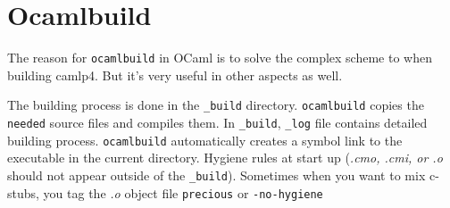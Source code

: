 \section{Ocamlbuild}
The reason for \verb|ocamlbuild| in OCaml is to solve the complex
scheme to when building camlp4. But it's very useful in other aspects
as well.

The building process is done in the \verb|_build|
directory. \verb|ocamlbuild| copies the \verb|needed| source files and
compiles them.  In \verb|_build|, \verb|_log| file contains detailed
building process. \verb|ocamlbuild| automatically creates a symbol
link to the executable in the current directory.  Hygiene rules at
start up (\textit{.cmo, .cmi, or .o} should not appear outside of the
\verb|_build|). Sometimes when you want to mix c-stubs, you tag the
\textit{.o} object file \verb|precious| or \verb|-no-hygiene|

